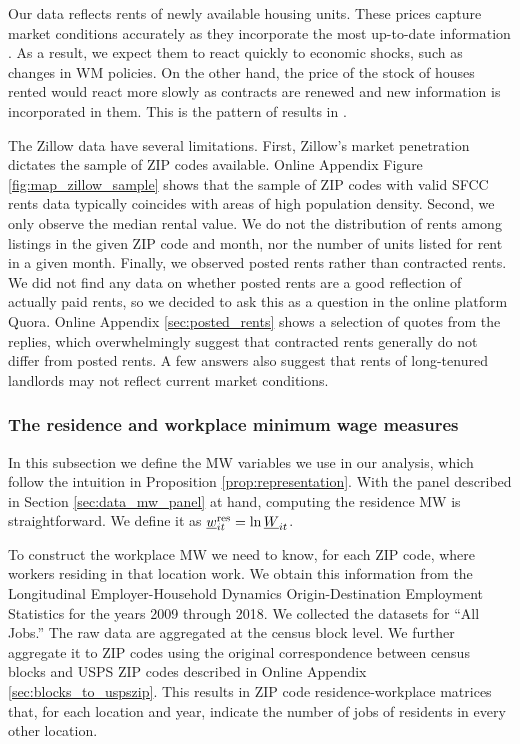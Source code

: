 Our data reflects rents of newly available housing units.
These prices capture market conditions accurately as they incorporate the most
up-to-date information \parencite{AmbroseEtAl2015}.
As a result, we expect them to react quickly to economic shocks, such as 
changes in WM policies.
On the other hand, the price of the stock of houses rented would react more 
slowly as contracts are renewed and new information is incorporated in them.
This is the pattern of results in  \textcite{AgarwalEtAl2021}.

The Zillow data have several limitations.
First, Zillow's market penetration dictates the sample of ZIP codes available.
Online Appendix Figure \ref{fig:map_zillow_sample} shows that the sample of ZIP 
codes with valid SFCC rents data typically coincides with areas of high 
population density.
Second, we only observe the median rental value.
We do not the distribution of rents among listings in the given ZIP code and 
month, nor the number of units listed for rent in a given month.
Finally, we observed posted rents rather than contracted rents.
We did not find any data on whether posted rents are a good reflection of 
actually paid rents, so we decided to ask this as a question in the online 
platform Quora.
Online Appendix \ref{sec:posted_rents} shows a selection of quotes from the 
replies, which overwhelmingly suggest that contracted rents generally do not 
differ from posted rents.
A few answers also suggest that rents of long-tenured landlords may not
reflect current market conditions.

\subsubsection{The residence and workplace minimum wage measures}
\label{sec:data_mw_measures}

In this subsection we define the MW variables we use in our analysis,
which follow the intuition in Proposition \ref{prop:representation}.
With the panel described in Section \ref{sec:data_mw_panel} at hand, computing 
the residence MW is straightforward.
We define it as $\underline{w}^{\text{res}}_{it} = \ln \underline{W}_{it}$.

To construct the workplace MW we need to know, for each ZIP code, where workers 
residing in that location work.
We obtain this information from the Longitudinal Employer-Household 
Dynamics Origin-Destination Employment Statistics \parencite[LODES;][]{CensusLODES}
for the years 2009 through 2018.
We collected the datasets for ``All Jobs.''
The raw data are aggregated at the census block level. 
We further aggregate it to ZIP codes using the original correspondence between 
census blocks and USPS ZIP codes described in Online Appendix 
\ref{sec:blocks_to_uspszip}.
This results in ZIP code residence-workplace matrices that, for each location 
and year, indicate the number of jobs of residents in every other location.

